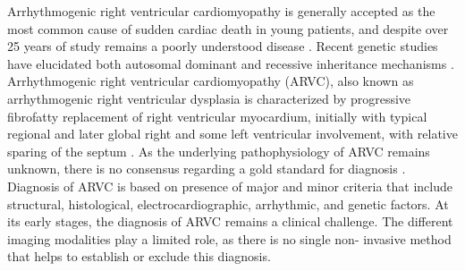Arrhythmogenic right ventricular cardiomyopathy is generally accepted as the most common cause of sudden cardiac death in young patients, and despite over 25 years of study remains a poorly understood disease \cite{ferrari2003arv, thiene1988rvc}. Recent genetic studies have elucidated both autosomal dominant and recessive inheritance mechanisms \cite{paul2003gar}. Arrhythmogenic right ventricular cardiomyopathy (ARVC), also known as arrhythmogenic right ventricular dysplasia is characterized by progressive fibrofatty replacement of right ventricular myocardium, initially with typical regional and later global right and some left ventricular involvement, with relative sparing of the septum \cite{thiene1988rvc}. As the underlying pathophysiology of ARVC remains unknown, there is no consensus regarding a gold standard for diagnosis \cite{thiene2000pap}. Diagnosis of ARVC is based on presence of major and minor criteria that include structural, histological, electrocardiographic, arrhythmic, and genetic factors. At its early stages, the diagnosis of ARVC remains a clinical challenge. The different imaging modalities play a limited role, as there is no single non- invasive method that helps to establish or exclude this diagnosis.

